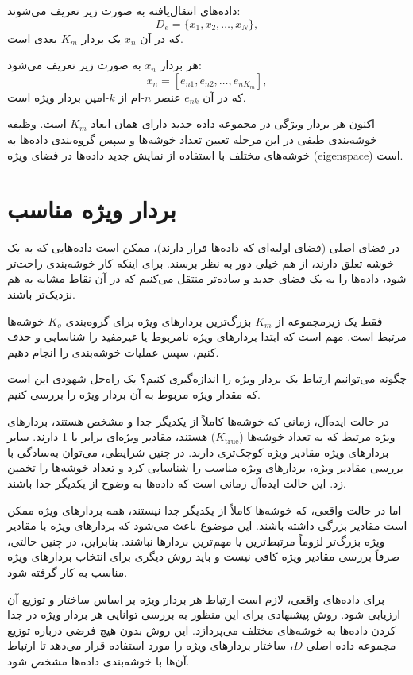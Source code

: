 \documentclass[a4paper,12pt,openany]{report}
\begin{document}
داده‌های انتقال‌یافته به صورت زیر تعریف می‌شوند:
\[
D_e = \{x_1, x_2, \dots, x_N\},
\]
که در آن \( x_n \) یک بردار \( K_m \)-بعدی است.  

هر بردار \( x_n \) به صورت زیر تعریف می‌شود:
\[
x_n = [e_{n1}, e_{n2}, \dots, e_{nK_m}],
\]
که در آن \( e_{nk} \) عنصر \( n \)-ام از \( k \)-امین بردار ویژه است.

اکنون هر بردار ویژگی در مجموعه داده جدید دارای همان ابعاد \( K_m \) است.  
وظیفه خوشه‌بندی طیفی در این مرحله تعیین تعداد خوشه‌ها و سپس گروه‌بندی داده‌ها به خوشه‌های مختلف با استفاده از نمایش جدید داده‌ها در فضای ویژه (eigenspace) است.
\section{بردار ویژه مناسب}
در فضای اصلی (فضای اولیه‌ای که داده‌ها قرار دارند)، ممکن است داده‌هایی که به یک خوشه تعلق دارند، از هم خیلی دور به نظر برسند. برای اینکه کار خوشه‌بندی راحت‌تر شود، داده‌ها را به یک فضای جدید و ساده‌تر منتقل می‌کنیم که در آن نقاط مشابه به هم نزدیک‌تر باشند.

فقط یک زیرمجموعه از \( K_m \) بزرگ‌ترین بردارهای ویژه برای گروه‌بندی \( K_o \) خوشه‌ها مرتبط است.  
مهم است که ابتدا بردارهای ویژه نامربوط یا غیرمفید را شناسایی و حذف کنیم، سپس عملیات خوشه‌بندی را انجام دهیم.  

چگونه می‌توانیم ارتباط یک بردار ویژه را اندازه‌گیری کنیم؟  
یک راه‌حل شهودی این است که مقدار ویژه مربوط به آن بردار ویژه را بررسی کنیم.

در حالت ایده‌آل، زمانی که خوشه‌ها کاملاً از یکدیگر جدا و مشخص هستند، بردارهای ویژه مرتبط که به تعداد خوشه‌ها (\( K_{\text{true}} \)) هستند، مقادیر ویژه‌ای برابر با 1 دارند. سایر بردارهای ویژه مقادیر ویژه کوچک‌تری دارند. در چنین شرایطی، می‌توان به‌سادگی با بررسی مقادیر ویژه، بردارهای ویژه مناسب را شناسایی کرد و تعداد خوشه‌ها را تخمین زد. این حالت ایده‌آل زمانی است که داده‌ها به وضوح از یکدیگر جدا باشند.  

اما در حالت واقعی، که خوشه‌ها کاملاً از یکدیگر جدا نیستند، همه بردارهای ویژه ممکن است مقادیر بزرگی داشته باشند. این موضوع باعث می‌شود که بردارهای ویژه با مقادیر ویژه بزرگ‌تر لزوماً مرتبط‌ترین یا مهم‌ترین بردارها نباشند. بنابراین، در چنین حالتی، صرفاً بررسی مقادیر ویژه کافی نیست و باید روش دیگری برای انتخاب بردارهای ویژه مناسب به کار گرفته شود.  

برای داده‌های واقعی، لازم است ارتباط هر بردار ویژه بر اساس ساختار و توزیع آن ارزیابی شود. روش پیشنهادی برای این منظور به بررسی توانایی هر بردار ویژه در جدا کردن داده‌ها به خوشه‌های مختلف می‌پردازد. این روش بدون هیچ فرضی درباره توزیع مجموعه داده اصلی \( D \)، ساختار بردارهای ویژه را مورد استفاده قرار می‌دهد تا ارتباط آن‌ها با خوشه‌بندی داده‌ها مشخص شود.  
\end{document}
